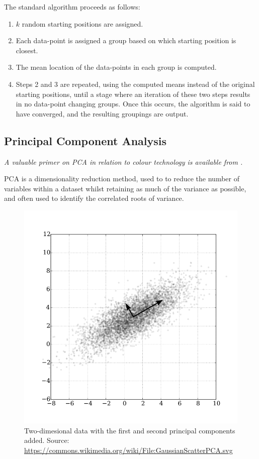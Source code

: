 The standard algorithm proceeds as follows: 

\begin{enumerate}
    \item $k$ random starting positions are assigned. 
    \item Each data-point is assigned a group based on which starting position is closest.
    \item The mean location of the data-points in each group is computed.
    \item Steps 2 and 3 are repeated, using the computed means instead of the original starting positions, until a stage where an iteration of these two steps results in no data-point changing groups. Once this occurs, the algorithm is said to have converged, and the resulting groupings are output.
\end{enumerate}

\subsection{Principal Component Analysis}

\textit{A valuable primer on \acrshort{PCA} in relation to colour technology is available from \citet{tzeng_review_2005}.}

\bigskip

\Gls{PCA} is a dimensionality reduction method, used to to reduce the number of variables within a dataset whilst retaining as much of the variance as possible, and often used to identify the correlated roots of variance.

\begin{figure}[htbp]
 \includegraphics[max width=\textwidth]{figs/LitRev/PCA.png}
 \caption{Two-dimesional data with the first and second principal components added. Source: \url{https://commons.wikimedia.org/wiki/File:GaussianScatterPCA.svg}}
 \label{fig:PCA}
\end{figure} 


